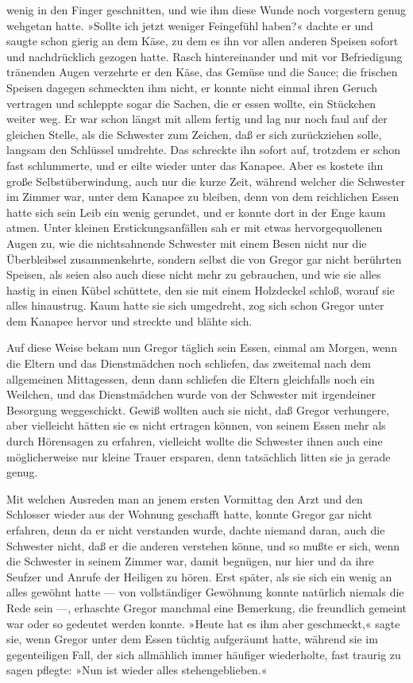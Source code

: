 wenig in den Finger geschnitten, und wie ihm diese Wunde noch vorgestern
genug wehgetan hatte. »Sollte ich jetzt weniger Feingefühl haben?«
dachte er und saugte schon gierig an dem Käse, zu dem es ihn vor allen
anderen Speisen sofort und nachdrücklich gezogen hatte. Rasch
hintereinander und mit vor Befriedigung tränenden Augen verzehrte er den
Käse, das Gemüse und die Sauce; die frischen Speisen dagegen schmeckten
ihm nicht, er konnte nicht einmal ihren Geruch vertragen und schleppte
sogar die Sachen, die er essen wollte, ein Stückchen weiter weg. Er war
schon längst mit allem fertig und lag nur noch faul auf der gleichen
Stelle, als die Schwester zum Zeichen, daß er sich zurückziehen solle,
langsam den Schlüssel umdrehte. Das schreckte ihn sofort auf, trotzdem
er schon fast schlummerte, und er eilte wieder unter das Kanapee. Aber
es kostete ihn große Selbstüberwindung, auch nur die kurze Zeit, während
welcher die Schwester im Zimmer war, unter dem Kanapee zu bleiben, denn
von dem reichlichen Essen hatte sich sein Leib ein wenig gerundet, und
er konnte dort in der Enge kaum atmen. Unter kleinen Erstickungsanfällen
sah er mit etwas hervorgequollenen Augen zu, wie die nichtsahnende
Schwester mit einem Besen nicht nur die Überbleibsel zusammenkehrte,
sondern selbst die von Gregor gar nicht berührten Speisen, als seien
also auch diese nicht mehr zu gebrauchen, und wie sie alles hastig in
einen Kübel schüttete, den sie mit einem Holzdeckel schloß, worauf sie
alles hinaustrug. Kaum hatte sie sich umgedreht, zog sich schon Gregor
unter dem Kanapee hervor und streckte und blähte sich.

Auf diese Weise bekam nun Gregor täglich sein Essen, einmal am Morgen,
wenn die Eltern und das Dienstmädchen noch schliefen, das zweitemal nach
dem allgemeinen Mittagessen, denn dann schliefen die Eltern gleichfalls
noch ein Weilchen, und das Dienstmädchen wurde von der Schwester mit
irgendeiner Besorgung weggeschickt. Gewiß wollten auch sie nicht, daß
Gregor verhungere, aber vielleicht hätten sie es nicht ertragen können,
von seinem Essen mehr als durch Hörensagen zu erfahren, vielleicht
wollte die Schwester ihnen auch eine möglicherweise nur kleine Trauer
ersparen, denn tatsächlich litten sie ja gerade genug.

Mit welchen Ausreden man an jenem ersten Vormittag den Arzt und den
Schlosser wieder aus der Wohnung geschafft hatte, konnte Gregor gar
nicht erfahren, denn da er nicht verstanden wurde, dachte niemand daran,
auch die Schwester nicht, daß er die anderen verstehen könne, und so
mußte er sich, wenn die Schwester in seinem Zimmer war, damit begnügen,
nur hier und da ihre Seufzer und Anrufe der Heiligen zu hören. Erst
später, als sie sich ein wenig an alles gewöhnt hatte --- von
vollständiger Gewöhnung konnte natürlich niemals die Rede sein ---,
erhaschte Gregor manchmal eine Bemerkung, die freundlich gemeint war
oder so gedeutet werden konnte. »Heute hat es ihm aber geschmeckt,«
sagte sie, wenn Gregor unter dem Essen tüchtig aufgeräumt hatte, während
sie im gegenteiligen Fall, der sich allmählich immer häufiger
wiederholte, fast traurig zu sagen pflegte: »Nun ist wieder alles
stehengeblieben.«

